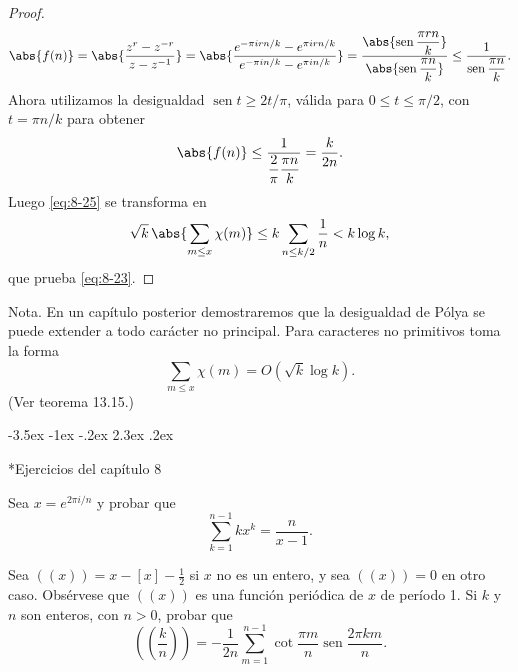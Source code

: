 \documentclass[12pt,a4paper]{book}
\makeatletter
\renewcommand\section{\@startsection{section}{1}{\z@}%
  {-3.5ex \@plus -1ex \@minus -.2ex}%
  {2.3ex \@plus .2ex}%
  {\normalfont\Large\bfseries\raggedright}}
\makeatother
\begin{document}
\begin{proof}
\begin{equation}
            \abs{f(n)}=\abs{\frac{z^{r}-z^{-r}}{z-z^{-1}}}=\abs{\frac{e^{-\pi irn/k}-e^{\pi irn/k}}{e^{-\pi in/k}-e^{\pi in/k}}}
            =\frac{\abs{\operatorname{sen}\dfrac{\pi rn}{k}}}{\abs{\operatorname{sen}\dfrac{\pi n}{k}}}\leq\frac{1}{\operatorname{sen}\dfrac{\pi n}{k}}.
        \end{equation}
        Ahora utilizamos la desigualdad $\operatorname{sen}t\geq2t/\pi$, válida para
        $0\leq t\leq\pi/2$, con $t=\pi n/k$ para obtener
        \begin{equation*}
            \abs{f(n)}\leq\frac{1}{\dfrac{2}{\pi}\dfrac{\pi n}{k}}=\frac{k}{2n}.
        \end{equation*}
        Luego \eqref{eq:8-25} se transforma en
        \begin{equation*}
            \sqrt{k}\,\abs{\sum_{m\leq x}\chi(m)}\leq k\sum_{n\leq k/2}\frac{1}{n}<k\log k,
        \end{equation*}
        que prueba \eqref{eq:8-23}.
    \end{proof}

    Nota. En un capítulo posterior demostraremos que la desigualdad de Pólya se puede
    extender a todo carácter no principal. Para caracteres no primitivos toma la forma
    \begin{equation*}
        \sum_{m\leq x}\chi(m)=O(\sqrt{k}\log k).
    \end{equation*}
    (Ver teorema 13.15.)

    \section*{Ejercicios del capítulo 8}

    \begin{ejercicio}
        Sea $x=e^{2\pi i/n}$ y probar que
        \begin{equation*}
            \sum_{k=1}^{n-1}kx^{k}=\frac{n}{x-1}.
        \end{equation*}
    \end{ejercicio}

    \begin{ejercicio}
        Sea $((x))=x-[x]-\tfrac{1}{2}$ si $x$ no es un entero, y sea $((x))=0$ en otro caso.
        Obsérvese que $((x))$ es una función periódica de $x$ de período 1. Si $k$ y $n$ son
        enteros, con $n>0$, probar que
        \begin{equation*}
            \left(\!\left(\frac{k}{n}\right)\!\right)=-\frac{1}{2n}\sum_{m=1}^{n-1}\cot\frac{\pi m}{n}\operatorname{sen}\frac{2\pi km}{n}.
        \end{equation*}
    \end{ejercicio}
\end{document}
